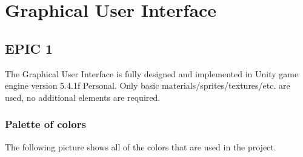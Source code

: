 \section{Graphical User Interface}

\subsection{EPIC 1}
\noindent The Graphical User Interface is fully designed and implemented in Unity game engine version 5.4.1f Personal. Only basic materials/sprites/textures/etc. are used, no additional elements are required.

\subsubsection{Palette of colors}
The following picture shows all of the colors that are used in the project.


